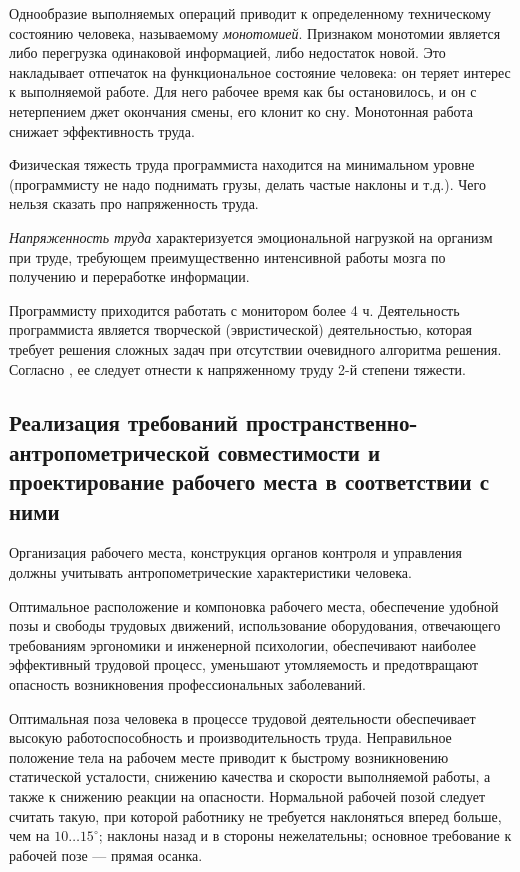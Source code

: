 Однообразие выполняемых операций приводит к определенному техническому состоянию человека, называемому \emph{монотомией}. Признаком монотомии является либо перегрузка одинаковой информацией, либо недостаток новой. Это накладывает отпечаток на функциональное состояние человека: он теряет интерес к выполняемой работе. Для него рабочее время как бы остановилось, и он с нетерпением джет окончания смены, его клонит ко сну. Монотонная работа снижает эффективность труда.\cite{belov09}

Физическая тяжесть труда программиста находится на минимальном уровне (программисту не надо поднимать грузы, делать частые наклоны и т.д.).
Чего нельзя сказать про напряженность труда.\cite{belov09}

\emph{Напряженность труда} характеризуется эмоциональной нагрузкой на организм при труде, требующем преимущественно интенсивной работы мозга по получению и переработке информации.\cite{belov09}

Программисту приходится работать с монитором более 4 ч. Деятельность программиста является творческой (эвристической) деятельностью, которая требует решения сложных задач при отсутствии очевидного алгоритма решения. Согласно \cite{belov09}, ее следует отнести к напряженному труду 2-й степени тяжести.

\subsection{Реализация требований пространственно\hyp{}антропометрической совместимости и проектирование рабочего места в соответствии с ними}
Организация рабочего места, конструкция органов контроля и управления должны учитывать антропометрические характеристики человека.\cite{devisilov09}

Оптимальное расположение и компоновка рабочего места, обеспечение удобной позы и свободы трудовых движений, использование оборудования, отвечающего требованиям эргономики и инженерной психологии, обеспечивают наиболее эффективный трудовой процесс, уменьшают утомляемость и предотвращают опасность возникновения профессиональных заболеваний.

Оптимальная поза человека в процессе трудовой деятельности обеспечивает высокую работоспособность и производительность труда. Неправильное положение тела на рабочем месте приводит к быстрому возникновению статической усталости, снижению качества и скорости выполняемой работы, а также к снижению реакции на опасности. Нормальной рабочей позой следует считать такую, при которой работнику не требуется наклоняться вперед больше, чем на \(10\dots15^{\circ}\); наклоны назад и в стороны нежелательны; основное требование к рабочей позе --- прямая осанка.

